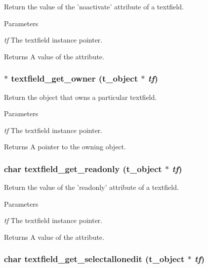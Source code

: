 Return the value of the 'noactivate' attribute of a textfield. 
\begin{DoxyParams}{Parameters}
\item[{\em tf}]The textfield instance pointer. \end{DoxyParams}
\begin{DoxyReturn}{Returns}
A value of the attribute. 
\end{DoxyReturn}
\hypertarget{group__textfield_ga02adcf0c2ca273b730cdbb0030585f26}{
\subsubsection[{textfield\_\-get\_\-owner}]{$\ast$ textfield\_\-get\_\-owner ({\bf t\_\-object} $\ast$ {\em tf})}}
\label{group__textfield_ga02adcf0c2ca273b730cdbb0030585f26}


Return the object that owns a particular textfield. 
\begin{DoxyParams}{Parameters}
\item[{\em tf}]The textfield instance pointer. \end{DoxyParams}
\begin{DoxyReturn}{Returns}
A pointer to the owning object. 
\end{DoxyReturn}
\hypertarget{group__textfield_ga7d305f5d1c0350202305a28b39aa7d94}{
\subsubsection[{textfield\_\-get\_\-readonly}]{\setlength{\rightskip}{0pt plus 5cm}char textfield\_\-get\_\-readonly ({\bf t\_\-object} $\ast$ {\em tf})}}
\label{group__textfield_ga7d305f5d1c0350202305a28b39aa7d94}


Return the value of the 'readonly' attribute of a textfield. 
\begin{DoxyParams}{Parameters}
\item[{\em tf}]The textfield instance pointer. \end{DoxyParams}
\begin{DoxyReturn}{Returns}
A value of the attribute. 
\end{DoxyReturn}
\hypertarget{group__textfield_gae3eebe8d0134d575ba3f8b8b3c814e92}{
\subsubsection[{textfield\_\-get\_\-selectallonedit}]{\setlength{\rightskip}{0pt plus 5cm}char textfield\_\-get\_\-selectallonedit ({\bf t\_\-object} $\ast$ {\em tf})}}
\label{group__textfield_gae3eebe8d0134d575ba3f8b8b3c814e92}


